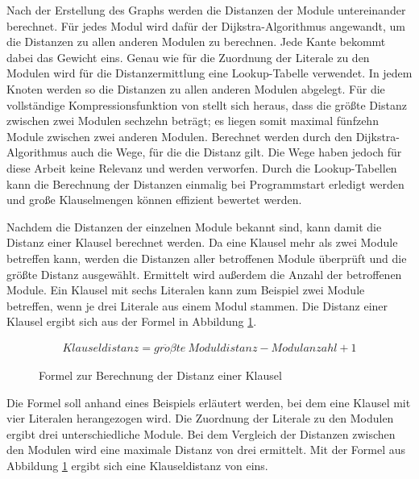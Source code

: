 Nach der Erstellung des Graphs werden die Distanzen der Module untereinander berechnet. Für jedes Modul wird dafür der Dijkstra-Algorithmus \cite{dijkstra} angewandt,
um die Distanzen zu allen anderen Modulen zu berechnen. Jede Kante bekommt dabei das Gewicht eins. Genau wie für die Zuordnung der Literale zu den Modulen wird für
die Distanzermittlung eine Lookup-Tabelle verwendet. In jedem Knoten werden so die Distanzen zu allen anderen Modulen abgelegt. Für die vollständige Kompressionsfunktion
von  stellt sich heraus, dass die größte Distanz zwischen zwei Modulen sechzehn beträgt; es liegen somit maximal fünfzehn Module zwischen zwei anderen
Modulen. Berechnet werden durch den Dijkstra-Algorithmus auch die Wege, für die die Distanz gilt. Die Wege haben jedoch für diese Arbeit keine Relevanz und werden
verworfen. Durch die Lookup-Tabellen kann die Berechnung der Distanzen einmalig bei Programmstart erledigt werden und große Klauselmengen können effizient bewertet werden.

Nachdem die Distanzen der einzelnen Module bekannt sind, kann damit die Distanz einer Klausel berechnet werden. Da eine Klausel mehr als zwei Module betreffen kann, werden
die Distanzen aller betroffenen Module überprüft und die größte Distanz ausgewählt. Ermittelt wird außerdem die Anzahl der betroffenen Module. Ein Klausel mit sechs Literalen
kann zum Beispiel zwei Module betreffen, wenn je drei Literale aus einem Modul stammen. Die Distanz einer Klausel ergibt sich aus der Formel in Abbildung \ref{eq:clausedistance}.
\begin{figure}[!h]
  \begin{align*}
  Klauseldistanz = gr\ddot{o}{\beta}te~Moduldistanz - Modulanzahl + 1
  \end{align*}
  \caption{Formel zur Berechnung der Distanz einer Klausel}
  \label{eq:clausedistance}
\end{figure}

Die Formel soll anhand eines Beispiels erläutert werden, bei dem eine Klausel mit vier Literalen herangezogen wird. Die Zuordnung der Literale
zu den Modulen ergibt drei unterschiedliche Module. Bei dem Vergleich der Distanzen zwischen den Modulen wird eine maximale Distanz von drei ermittelt.
Mit der Formel aus Abbildung \ref{eq:clausedistance} ergibt sich eine Klauseldistanz von eins.

